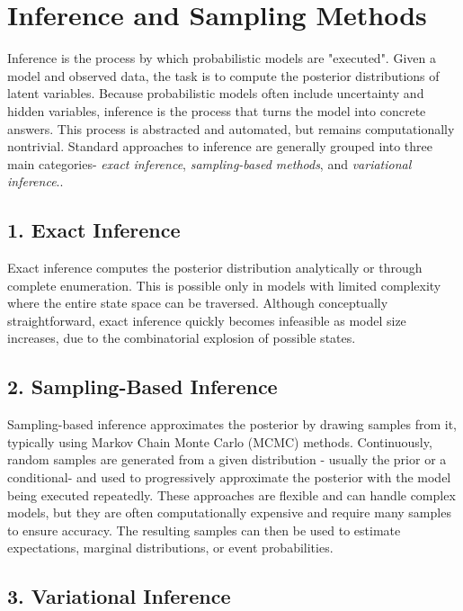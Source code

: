 \section{Inference and Sampling Methods}

Inference is the process by which probabilistic models are "executed". Given a model and observed data, the task is to compute the posterior distributions of latent variables.
Because probabilistic models often include uncertainty and hidden variables, inference is the process that turns the model into concrete answers.
This process is abstracted and automated, but remains computationally nontrivial. Standard approaches to inference are generally grouped
into three main categories- \textit{exact inference}, \textit{sampling-based methods}, and \textit{variational inference}.\cite{bishop2006prml, blei2017vi, goodman2014dippl}.

\subsection*{1. Exact Inference}

Exact inference computes the posterior distribution analytically or through complete enumeration. This is possible only in models with limited complexity where the
entire state space can be traversed. Although conceptually straightforward, exact inference quickly becomes infeasible as model size increases, due to the combinatorial
explosion of possible states.

\subsection*{2. Sampling-Based Inference}

Sampling-based inference approximates the posterior by drawing samples from it, typically using Markov Chain Monte Carlo (MCMC) methods.
Continuously, random samples are generated from a given distribution - usually the prior or a conditional- and used to progressively approximate
the posterior with the model being executed repeatedly.
These approaches are flexible and can handle complex models, but they are often computationally expensive and require many samples to ensure accuracy.
The resulting samples can then be used to estimate expectations, marginal distributions, or event probabilities.

\subsection*{3. Variational Inference}

